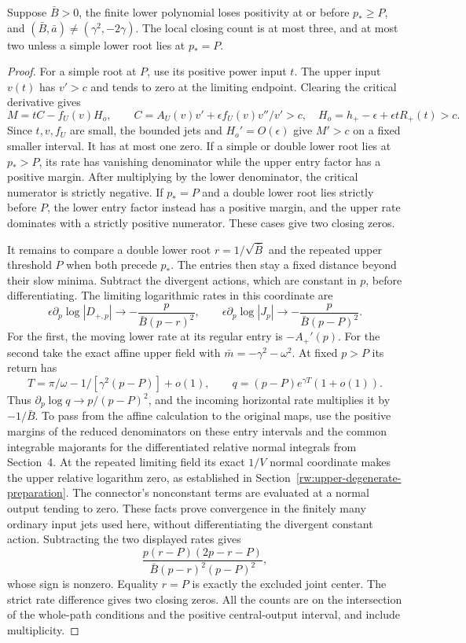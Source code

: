 \begin{proposition}
\label{rw:infinity:repeated-lower-loss}
Suppose $\bar B>0$, the finite lower polynomial loses positivity
at or before $p_*\ge P$, and
$(\bar B,\bar a)\ne(\gamma^2,-2\gamma)$.
The local closing count is at most three, and at most two unless
a simple lower root lies at $p_*=P$.
\end{proposition}
\begin{proof}
For a simple root at $P$, use its positive power input $t$.
The upper input $v(t)$ has $v'>c$ and tends to zero at the limiting
endpoint. Clearing the critical derivative gives
\[
 M=tC-f_U(v)H_o,\qquad
 C=A_U(v)v'+\epsilon f_U(v)v''/v'>c,
 \quad H_o=h_+-\epsilon+\epsilon tR_+(t)>c.
\]
Since $t,v,f_U$ are small, the bounded jets and $H_o'=O(\epsilon)$
give $M'>c$ on a fixed smaller interval. It has at most one zero.
If a simple or double lower root lies at $p_*>P$, its rate has
vanishing denominator while the upper entry factor has a positive
margin. After multiplying by the lower denominator, the critical
numerator is strictly negative. If $p_*=P$ and a double lower
root lies strictly before $P$, the lower entry factor instead has
a positive margin, and the upper rate dominates with a strictly
positive numerator. These cases give two closing zeros.

It remains to compare a double lower root $r=1/\sqrt{\bar B}$
and the repeated upper threshold $P$ when both precede $p_*$.
The entries then stay a fixed distance beyond their slow minima.
Subtract the divergent actions, which are constant in $p$, before
differentiating. The limiting logarithmic rates in this coordinate are
\[
 \epsilon\partial_p\log|D_{+,p}|\longrightarrow
                   -\frac p{\bar B(p-r)^2},\qquad
 \epsilon\partial_p\log|J_p|\longrightarrow
                   -\frac p{\bar B(p-P)^2}.
\]
For the first, the moving lower rate at its regular entry is
$-A_+'(p)$. For the second take the exact affine upper field with
$\bar m=-\gamma^2-\omega^2$. At fixed $p>P$ its return has
\[
 T=\pi/\omega-1/[\gamma^2(p-P)]+o(1),\qquad
 q=(p-P)e^{\gamma T}(1+o(1)).
\]
Thus $\partial_p\log q\to p/(p-P)^2$, and the incoming
horizontal rate multiplies it by $-1/\bar B$.
To pass from the affine calculation to the original maps, use the
positive margins of the reduced denominators on these entry intervals
and the common integrable majorants for the differentiated relative
normal integrals from Section~4. At the repeated limiting field
its exact $1/V$ normal coordinate makes the upper relative logarithm
zero, as established in Section~\ref{rw:upper-degenerate-preparation}.
The connector's nonconstant terms
are evaluated at a normal output tending to zero. These facts prove
convergence in the finitely many ordinary input jets used here,
without differentiating the divergent constant action.
Subtracting the two displayed rates gives
\[
 \frac{p(r-P)(2p-r-P)}
      {\bar B(p-r)^2(p-P)^2},
\]
whose sign is nonzero. Equality $r=P$ is exactly the excluded joint
center. The strict rate difference gives two closing zeros.
All the counts are on the intersection of the whole-path conditions
and the positive central-output interval, and include multiplicity.
\end{proof}

